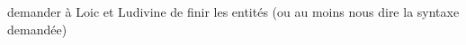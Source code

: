 
\begin{DoxyRefList}
\item[\label{todo__todo000001}%
\Hypertarget{todo__todo000001}%
Member \hyperlink{classjeu_aabf11934ce63bc5d71bbd27e1523fc45}{jeu\+:\+:demarrer\+\_\+jeu} ()]demander à Loic et Ludivine de finir les entités (ou au moins nous dire la syntaxe demandée) 
\end{DoxyRefList}